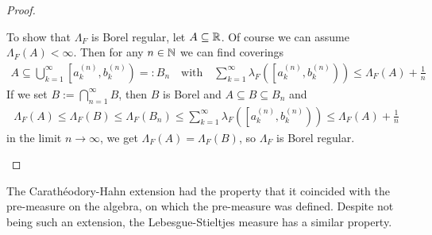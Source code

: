 \begin{proof}
\begin{enumerate}[{(}i{)}]
  To show that $\Lambda_F$ is Borel regular, let $A \subseteq \mathbb{R}$.
  Of course we can assume $\Lambda_F(A) < \infty$.
  Then for any $n \in \mathbb{N}$ we can find coverings 
  \begin{align*}
    A \subseteq \bigcup_{k=1}^{\infty} \left[a_k^{(n)},b_k^{(n)}\right) =: B_n 
    \quad \text{with} \quad 
    \sum_{k=1}^{\infty} \lambda_F\left(\left[a_k^{(n)},b_k^{(n)}\right)\right) \leq \Lambda_F(A) + \frac{1}{n}
  \end{align*}
  If we set $B := \bigcap_{n=1}^{\infty}B$, then $B$ is Borel and $A \subseteq B \subseteq B_n$ and 
  \begin{align*}
    \Lambda_F(A) \leq \Lambda_F(B) \leq \Lambda_F(B_n) 
    \leq 
    \sum_{k=1}^{\infty}\lambda_F\left(\left[a_k^{(n)},b_k^{(n)}\right)\right) \leq \Lambda_F(A) + \frac{1}{n}
  \end{align*}
  in the limit $n \to \infty$, we get $\Lambda_F(A) = \Lambda_F(B)$, so $\Lambda_F$ is Borel regular.
  \end{enumerate}
\end{proof}


The Carathéodory-Hahn extension had the property that it coincided with the pre-measure on the algebra, on which the pre-measure was defined.
Despite not being such an extension, the Lebesgue-Stieltjes measure has a similar property.

